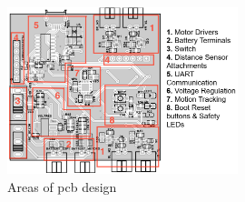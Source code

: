 \begin{figure}[H]
    \centering
    \captionsetup{justification=centering, margin=1cm}
    \includegraphics[width=0.6\textwidth]{img/pcb-sections3.PNG}
    \caption{Areas of \gls{pcb} design}
    \label{fig:pcb-sections}
\end{figure}

